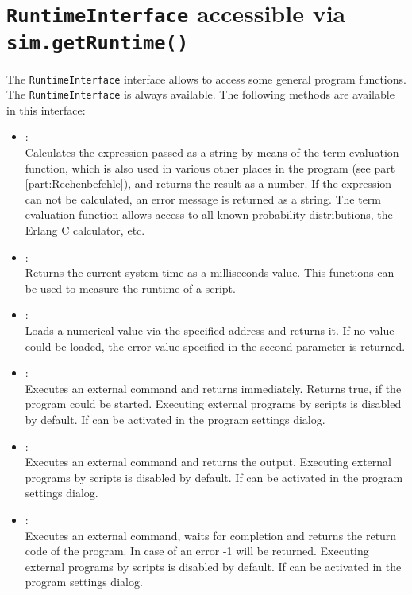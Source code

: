 \chapter{\texttt{RuntimeInterface} accessible via \texttt{sim.getRuntime()}}

The \texttt{RuntimeInterface} interface allows to access some general program functions.\\
The \texttt{RuntimeInterface} is always available. The following methods are available in this interface:

\begin{itemize}

\item
{}:\\
Calculates the expression passed as a string by means of the term evaluation function,
which is also used in various other places in the program (see part \ref{part:Rechenbefehle}), and returns the result as a  number.
If the expression can not be calculated, an error message is returned as a string.
The term evaluation function allows access to all known probability distributions,
the Erlang C calculator, etc.

\item
{}:\\
Returns the current system time as a milliseconds value. This functions can be used to measure
the runtime of a script.

\item
{}:\\
Loads a numerical value via the specified address and returns it.
If no value could be loaded, the error value specified in the second parameter is returned.

\item
{}:\\
Executes an external command and returns immediately. Returns true, if the program could be started.
Executing external programs by scripts is disabled by default. If can be activated
in the program settings dialog.

\item
{}:\\
Executes an external command and returns the output.
Executing external programs by scripts is disabled by default. If can be activated
in the program settings dialog.

\item
{}:\\
Executes an external command, waits for completion and returns the return code of the program.
In case of an error -1 will be returned.
Executing external programs by scripts is disabled by default. If can be activated
in the program settings dialog.

\end{itemize}



